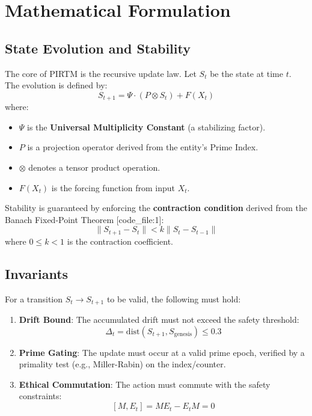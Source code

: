 \documentclass[11pt, a4paper]{article}
\begin{document}
\section{Mathematical Formulation}
\subsection{State Evolution and Stability}
The core of PIRTM is the recursive update law. Let $S_t$ be the state at time $t$. The evolution is defined by:
\begin{equation}
    S_{t+1} = \Psi \cdot (P \otimes S_t) + F(X_t)
\end{equation}
where:
\begin{itemize}
    \item $\Psi$ is the \textbf{Universal Multiplicity Constant} (a stabilizing factor).
    \item $P$ is a projection operator derived from the entity's Prime Index.
    \item $\otimes$ denotes a tensor product operation.
    \item $F(X_t)$ is the forcing function from input $X_t$.
\end{itemize}

Stability is guaranteed by enforcing the \textbf{contraction condition} derived from the Banach Fixed-Point Theorem [code\_file:1]:
\begin{equation}
    \| S_{t+1} - S_t \| < k \| S_t - S_{t-1} \|
\end{equation}
where $0 \le k < 1$ is the contraction coefficient.

\subsection{Invariants}
For a transition $S_t \to S_{t+1}$ to be valid, the following must hold:
\begin{enumerate}
    \item \textbf{Drift Bound}: The accumulated drift must not exceed the safety threshold:
    \[ \Delta_t = \mathrm{dist}(S_{t+1}, S_{\text{genesis}}) \le 0.3 \]
    \item \textbf{Prime Gating}: The update must occur at a valid prime epoch, verified by a primality test (e.g., Miller-Rabin) on the index/counter.
    \item \textbf{Ethical Commutation}: The action must commute with the safety constraints:
    \[ [M, E_t] = M E_t - E_t M = 0 \]
\end{enumerate}
\end{document}

